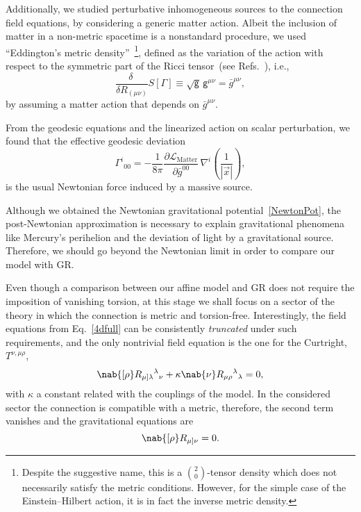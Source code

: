 \documentclass[aps,prl,twocolumn,superscriptaddress,showpacs,showkeys]{revtex4-1}
\begin{document}
Additionally, we studied perturbative inhomogeneous sources to the connection field equations, by considering a generic matter action. Albeit the inclusion of matter in a non-metric spacetime is a nonstandard procedure, we used ``Eddington's metric density''~\footnote{Despite the suggestive name, this is a $\binom{2}{0}$-tensor density which does not necessarily satisfy the metric conditions. However, for the simple case of the Einstein--Hilbert action, it is in fact the inverse metric density.}, defined as the variation of the action with respect to the symmetric part of the Ricci tensor~(see Refs.~\cite{Eddington1923math,schrodinger1950space,Poplawski:2012bw}), i.e.,%
\begin{equation}
  \label{metric}
  \frac{\delta\ }{\delta R_{(\mu\nu)}} S[\Gamma] \equiv \sqrt{\mathsf{g}} \, \mathsf{g}^{\mu\nu} = \bar{g}^{\mu\nu} ,
\end{equation}
by assuming a matter action that depends on $\bar{g}^{\mu\nu}$.

From the geodesic equations and the linearized action on scalar perturbation, we found that the effective geodesic deviation
\begin{equation}
  \label{NewtonPot}
  \Gamma^i{}_{00} = - \frac{1}{8\pi} \frac{ \partial\mathcal{L}_{\text{Matter}} }{ \partial \bar{g}^{00} } \, \nabla^i \left(\frac{1}{|\vec{x}|}\right),
\end{equation}
is the usual Newtonian force induced by a massive source.

Although we obtained the Newtonian gravitational potential~\eqref{NewtonPot}, the post-Newtonian approximation is necessary to explain gravitational phenomena like Mercury's perihelion and the deviation of light by a gravitational source. Therefore, we should go beyond the Newtonian limit in order to compare our model with GR.

Even though a comparison between our affine model and GR does not require the imposition of vanishing torsion, at this stage we shall focus on a sector of the theory in which the connection is metric and torsion-free. Interestingly, the field equations from Eq.~\eqref{4dfull} can be consistently \emph{truncated} under such requirements, and the only nontrivial field equation is the one for the Curtright, $T^{\nu,\mu\rho}$,
\begin{equation*}
  \nab{[\rho} R_{\mu]\lambda}{}^{\lambda}{}_{\nu} + \kappa \nab{\nu} R_{\mu\rho}{}^\lambda{}_\lambda = 0,
\end{equation*}
with $\kappa$ a constant related with the couplings of the model. In the considered sector the connection is compatible with a metric, therefore, the second term vanishes and the gravitational equations are
\begin{equation}
  \nab{[\rho} R_{\mu]\nu} = 0.
  \label{SimpleEOM}
\end{equation}
\end{document}

